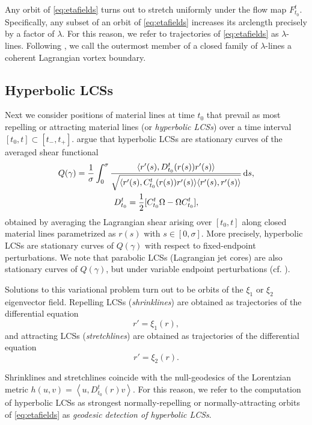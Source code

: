 \documentclass{elsarticle}
\begin{document}
Any orbit of \cref{eq:etafields} turns out to stretch uniformly under the flow map $F_{t_0}^t$. Specifically, any subset of an orbit of \cref{eq:etafields} increases its arclength precisely by a factor of $\lambda$. For this reason, we refer to trajectories of \cref{eq:etafields} as $\lambda$-lines. Following \citet{haller13:_coher_lagran}, we call the outermost member of a closed family of $\lambda$-lines a coherent Lagrangian vortex boundary.

\subsection{Hyperbolic LCSs}
\label{sec:Hyperbolic LCSs}

Next we consider positions of material lines at time $t_0$ that prevail as most repelling or attracting material lines (or \emph{hyperbolic LCSs}) over a time interval $[t_0,t] \subset [t_-,t_+]$. \citet{farazmand14:_shearless} argue that hyperbolic LCSs are stationary curves of the averaged shear functional
\begin{gather*}
Q(\gamma) = \frac{1}{\sigma} \int_0^\sigma \frac{\langle r'(s),D_{t_0}^t(r(s)) r'(s)\rangle}{\sqrt{\langle r'(s),C_{t_0}^t(r(s)) r'(s)\rangle\langle r'(s),r'(s)\rangle}}\dif s,\\
D_{t_0}^t = \frac12 [C_{t_0}^t \Omega - \Omega C_{t_0}^t],
\end{gather*}
obtained by averaging the Lagrangian shear arising over $[t_0,t]$ along closed material lines parametrized as $r(s)$ with $s \in [0,\sigma]$. More precisely, hyperbolic LCSs are stationary curves of $Q(\gamma)$ with respect to fixed-endpoint perturbations. We note that parabolic LCSs (Lagrangian jet cores) are also stationary curves of $Q(\gamma)$, but under variable endpoint perturbations (cf. \citet{farazmand14:_shearless}).

Solutions to this variational problem turn out to be orbits of the $\xi_1$ or $\xi_2$ eigenvector field. Repelling LCSs (\emph{shrinklines}) are obtained as trajectories of the differential equation
\begin{equation}
r' = \xi_1(r),
\label{eq:strainline}
\end{equation}
and attracting LCSs (\emph{stretchlines}) are obtained as trajectories of the differential equation
\begin{equation}
r' = \xi_2(r).
\label{eq:stretchline}
\end{equation}

Shrinklines and stretchlines coincide with the null-geodesics of the Lorentzian metric $h(u,v) = \left\langle u,D_{t_0}^t(r) v \right\rangle$. For this reason, we refer to the computation of hyperbolic LCSs as strongest normally-repelling or normally-attracting orbits of \cref{eq:etafields} as \emph{geodesic detection of hyperbolic LCSs}.
\end{document}
